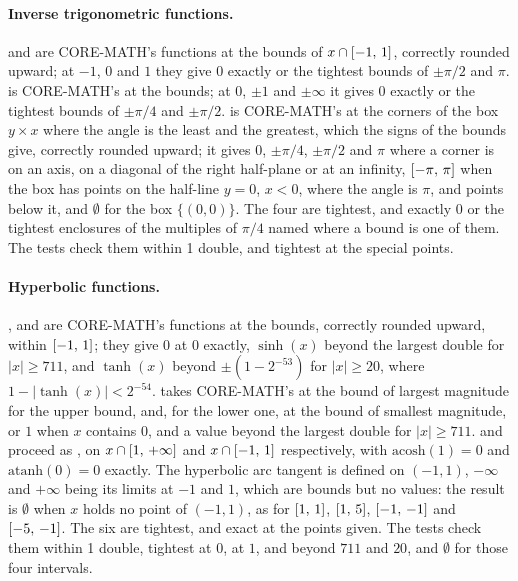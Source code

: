 \paragraph{Inverse trigonometric functions.}
 and  are CORE-MATH's functions at the bounds
of $x\cap[-1,\,1]$, correctly rounded upward; at $-1$, $0$ and $1$ they
give $0$ exactly or the tightest bounds of $\pm\pi/2$ and $\pi$.
 is CORE-MATH's  at the bounds; at $0$, $\pm1$
and $\pm\infty$ it gives $0$ exactly or the tightest bounds of $\pm\pi/4$
and $\pm\pi/2$.  is CORE-MATH's  at the
corners of the box $y\times x$ where the angle is the least and the
greatest, which the signs of the bounds give, correctly rounded upward; it
gives $0$, $\pm\pi/4$, $\pm\pi/2$ and $\pi$ where a corner is on an axis,
on a diagonal of the right half-plane or at an infinity, $[-\pi,\,\pi]$
when the box has points on the half-line $y=0$, $x<0$, where the angle is
$\pi$, and points below it, and $\emptyset$ for the box $\{(0, 0)\}$. The
four are tightest, and exactly $0$ or the tightest enclosures of the
multiples of $\pi/4$ named where a bound is one of them. The tests check
them within 1 double, and tightest at the special points.

\paragraph{Hyperbolic functions.}
,  and  are CORE-MATH's
functions at the bounds, correctly rounded upward,  within
$[-1,\,1]$; they give $0$ at $0$ exactly, $\sinh(x)$ beyond the largest
double for $|x|\geq711$, and $\tanh(x)$ beyond $\pm(1-2^{-53})$ for
$|x|\geq20$, where $1-|\tanh(x)|<2^{-54}$.  takes CORE-MATH's  at the bound of largest magnitude for the upper bound, and, for the lower one, at the bound of smallest magnitude, or $1$ when $x$
contains $0$, and a value beyond the largest double for $|x|\geq711$.  and  proceed as ,
on $x\cap[1,\,+\infty]$ and $x\cap[-1,\,1]$ respectively, with
$\mathrm{acosh}(1)=0$ and $\mathrm{atanh}(0)=0$ exactly. The hyperbolic arc
tangent is defined on $(-1, 1)$, $-\infty$ and $+\infty$ being its limits
at $-1$ and $1$, which are bounds but no values: the result is $\emptyset$
when $x$ holds no point of $(-1, 1)$, as for $[1,\,1]$, $[1,\,5]$,
$[-1,\,-1]$ and $[-5,\,-1]$.\newinvfive{} The six are tightest, and
exact at the points given. The tests check them within 1 double, tightest
at $0$, at $1$, and beyond $711$ and $20$, and $\emptyset$ for those four
intervals.


